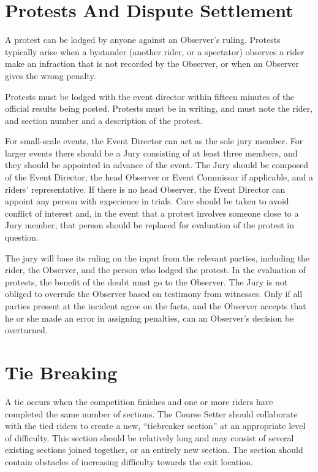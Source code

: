 \section{Protests And Dispute Settlement}
A protest can be lodged by anyone against an Observer's ruling. 
Protests typically arise when a bystander (another rider, or a spectator) observes a rider make an infraction that is not recorded by the Observer, or when an Observer gives the wrong penalty.

Protests must be lodged with the event director within fifteen minutes of the official results being posted. 
Protests must be in writing, and must note the rider, and section number and a description of the protest.

For small-scale events, the Event Director can act as the sole jury member. 
For larger events there should be a Jury consisting of at least three members, and they should be appointed in advance of the event. 
The Jury should be composed of the Event Director, the head Observer or Event Commissar if applicable, and a riders' representative. 
If there is no head Observer, the Event Director can appoint any person with experience in trials. 
Care should be taken to avoid conflict of interest and, in the event that a protest involves someone close to a Jury member, that person should be replaced for evaluation of the protest in question.

The jury will base its ruling on the input from the relevant parties, including the rider, the Observer, and the person who lodged the protest.
In the evaluation of protests, the benefit of the doubt must go to the Observer. 
The Jury is not obliged to overrule the Observer based on testimony from witnesses. 
Only if all parties present at the incident agree on the facts, and the Observer accepts that he or she made an error in assigning penalties, can an Observer's decision be overturned.

\section{Tie Breaking}
A tie occurs when the competition finishes and one or more riders have completed the same number of sections.
The Course Setter should collaborate with the tied riders to create a new, ``tiebreaker section'' at an appropriate level of difficulty. 
This section should be relatively long and may consist of several existing sections joined together, or an entirely new section.
The section should contain obstacles of increasing difficulty towards the exit location.

